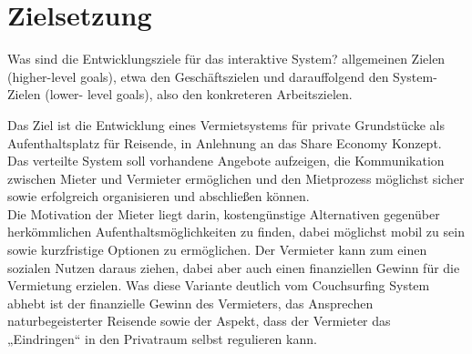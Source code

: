 
\section{Zielsetzung}
Was sind die Entwicklungsziele für das interaktive System?
allgemeinen Zielen (higher-level goals), etwa den Geschäftszielen und darauffolgend  
den System-Zielen (lower- level goals), also den konkreteren Arbeitszielen.
 
Das Ziel ist die Entwicklung eines Vermietsystems für private Grundstücke als Aufenthaltsplatz für Reisende, in Anlehnung an das Share Economy Konzept.\\
Das verteilte System soll vorhandene Angebote aufzeigen, die Kommunikation zwischen Mieter und Vermieter ermöglichen und den Mietprozess möglichst sicher sowie erfolgreich organisieren und abschließen können.\\
Die Motivation der Mieter liegt darin, kostengünstige Alternativen gegenüber herkömmlichen Aufenthaltsmöglichkeiten zu finden, dabei möglichst mobil zu sein sowie kurzfristige Optionen zu ermöglichen. Der Vermieter kann zum einen sozialen Nutzen daraus ziehen, dabei aber auch einen finanziellen Gewinn für die Vermietung erzielen. Was diese Variante deutlich vom Couchsurfing System abhebt ist der finanzielle Gewinn des Vermieters, das Ansprechen naturbegeisterter Reisende sowie der Aspekt, dass der Vermieter das „Eindringen“ in den Privatraum selbst regulieren kann.
 
